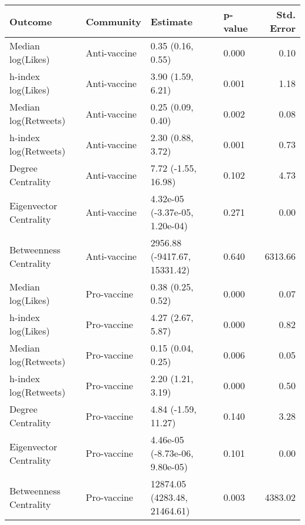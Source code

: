 \begin{table}[ht]
\centering
\begin{tabular}{llllr}
  \hline
Outcome & Community & Estimate & p-value & Std. Error \\ 
  \hline
Median log(Likes) & Anti-vaccine & 0.35 (0.16, 0.55) & 0.000 & 0.10 \\ 
  h-index log(Likes) & Anti-vaccine & 3.90 (1.59, 6.21) & 0.001 & 1.18 \\ 
  Median log(Retweets) & Anti-vaccine & 0.25 (0.09, 0.40) & 0.002 & 0.08 \\ 
  h-index log(Retweets) & Anti-vaccine & 2.30 (0.88, 3.72) & 0.001 & 0.73 \\ 
  Degree Centrality & Anti-vaccine & 7.72 (-1.55, 16.98) & 0.102 & 4.73 \\ 
  Eigenvector Centrality & Anti-vaccine & 4.32e-05 (-3.37e-05, 1.20e-04) & 0.271 & 0.00 \\ 
  Betweenness Centrality & Anti-vaccine & 2956.88 (-9417.67, 15331.42) & 0.640 & 6313.66 \\ 
  Median log(Likes) & Pro-vaccine & 0.38 (0.25, 0.52) & 0.000 & 0.07 \\ 
  h-index log(Likes) & Pro-vaccine & 4.27 (2.67, 5.87) & 0.000 & 0.82 \\ 
  Median log(Retweets) & Pro-vaccine & 0.15 (0.04, 0.25) & 0.006 & 0.05 \\ 
  h-index log(Retweets) & Pro-vaccine & 2.20 (1.21, 3.19) & 0.000 & 0.50 \\ 
  Degree Centrality & Pro-vaccine & 4.84 (-1.59, 11.27) & 0.140 & 3.28 \\ 
  Eigenvector Centrality & Pro-vaccine & 4.46e-05 (-8.73e-06, 9.80e-05) & 0.101 & 0.00 \\ 
  Betweenness Centrality & Pro-vaccine & 12874.05 (4283.48, 21464.61) & 0.003 & 4383.02 \\ 
   \hline
\end{tabular}
\end{table}

